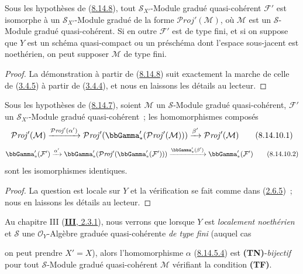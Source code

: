 \begin{corollary}[8.14.9]
\label{II.8.14.9-fr}
Sous les hypothèses de \textup{(\hyperref[II.8.14.8-fr]{8.14.8})}, tout
$\mathcal{S}_{X'}$-Module gradué quasi-cohérent $\mathcal{F}'$ est isomorphe
à un $\mathcal{S}_{X'}$-Module gradué de la forme
$\mathcal{P}\mathit{roj}'(\mathcal{M})$, où $\mathcal{M}$ est un
$\mathcal{S}$-Module gradué quasi-cohérent. Si en outre $\mathcal{F}'$ est de
type fini, et si on suppose que $Y$ est un schéma quasi-compact ou un
préschéma dont l'espace sous-jacent est noethérien, on peut supposer
$\mathcal{M}$ de type fini.
\end{corollary}

\begin{proof}
La démonstration à partir de (\hyperref[II.8.14.8-fr]{8.14.8}) suit
exactement la marche de celle de (\hyperref[II.3.4.5-fr]{3.4.5}) à partir de
(\hyperref[II.3.4.4-fr]{3.4.4}), et nous en laissons les détails au lecteur.
\end{proof}

\begin{proposition}[8.14.10]
\label{II.8.14.10-fr}
Sous les hypothèses de \textup{(\hyperref[II.8.14.7-fr]{8.14.7})}, soient
$\mathcal{M}$ un $\mathcal{S}$-Module gradué quasi-cohérent,
$\mathcal{F}'$ un $\mathcal{S}_{X'}$-Module gradué quasi-cohérent~; les
homomorphismes composés
\begin{equation}
\label{II.8.14.10.1-fr}
  \mathcal{P}\mathit{roj}'(\mathcal{M})
  \xrightarrow{\mathcal{P}\mathit{roj}'(\alpha')}
  \mathcal{P}\mathit{roj}'(\bbGamma'_*(\mathcal{P}\mathit{roj}'(\mathcal{M})))
  \xrightarrow{\beta'}\mathcal{P}\mathit{roj}'(\mathcal{M})
\tag{8.14.10.1}
\end{equation}
\begin{equation}
\label{II.8.14.10.2-fr}
  \bbGamma'_*(\mathcal{F}')
  \xrightarrow{\alpha'}
  \bbGamma'_*(\mathcal{P}\mathit{roj}'(\bbGamma'_*(\mathcal{F}')))
  \xrightarrow{\bbGamma'_*(\beta')}\bbGamma'_*(\mathcal{F}')
\tag{8.14.10.2}
\end{equation}
sont les isomorphismes identiques.
\end{proposition}

\begin{proof}
La question est locale sur $Y$ et la vérification se fait comme dans
(\hyperref[II.2.6.5-fr]{2.6.5})~; nous en laissons les détails au lecteur.
\end{proof}

\begin{remark}[8.14.11]
\label{II.8.14.11-fr}
Au chapitre III (\hyperref[III.2.3.1-fr]{\textbf{III}, 2.3.1}), nous verrons que
lorsque $Y$ est \emph{localement noethérien} et $\mathcal{S}$ une
$\mathcal{O}_Y$-Algèbre graduée quasi-cohérente \emph{de type fini} (auquel
cas

on peut prendre $X'=X$), alors l'homomorphisme $\alpha$
(\hyperref[II.8.14.5.4-fr]{8.14.5.4}) est \textbf{(TN)}-\emph{bijectif} pour
tout $\mathcal{S}$-Module gradué quasi-cohérent $\mathcal{M}$ vérifiant la
condition \textbf{(TF)}.
\end{remark}

